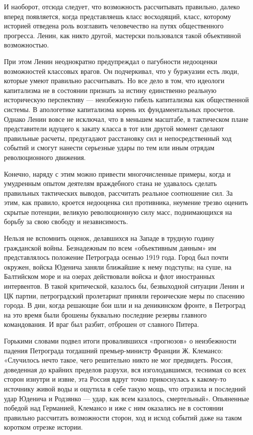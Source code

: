 \documentclass[12pt, a4paper, openany]{book}
\begin{document}
И наоборот, отсюда следует, что возможность рассчитывать правильно, далеко вперед появляется, когда представляешь класс восходящий, класс, которому историей отведена роль возглавить человечество на путях общественного прогресса. Ленин, как никто другой, мастерски пользовался такой объективной возможностью.

При этом Ленин неоднократно предупреждал о пагубности недооценки возможностей классовых врагов. Он подчеркивал, что у буржуазии есть люди, которые умеют правильно рассчитывать. Но все дело в том, что идеологи капитализма не в состоянии признать за истину единственно реальную историческую перспективу — неизбежную гибель капитализма как общественной системы. В апологетике капитализма корень их фундаментальных просчетов. Однако Ленин вовсе не исключал, что в меньшем масштабе, в тактическом плане представители идущего к закату класса в тот или другой момент сделают правильные расчеты, предугадают расстановку сил и непосредственный ход событий и смогут нанести серьезные удары по тем или иным отрядам революционного движения.

Конечно, наряду с этим можно привести многочисленные примеры, когда и умудренным опытом деятелям враждебного стана не удавалось сделать правильных тактических выводов, рассчитать реальное соотношение сил. За этим, как правило, кроется недооценка сил противника, неумение трезво оценить скрытые потенции, великую революционную силу масс, поднимающихся на борьбу за свою свободу и независимость.

Нельзя не вспомнить оценок, делавшихся на Западе в трудную годину гражданской войны. Безнадежным по всем «объективным данным» им представлялось положение Петрограда осенью 1919 года. Город был почти окружен, войска Юденича заняли ближайшие к нему подступы; на суше, на Балтийском море и на озерах действовали войска и флот иностранных интервентов. В такой критической, казалось бы, безвыходной ситуации Ленин и ЦК партии, петроградский пролетариат приняли героические меры по спасению города. В дни, когда решающие бои шли и на деникинском фронте, в Петроград на это время были брошены буквально последние резервы главного командования. И враг был разбит, отброшен от славного Питера.

Горькими словами подвел итоги провалившихся «прогнозов» о неизбежности падения Петрограда тогдашний премьер-министр Франции Ж. Клемансо: «Случилось нечто такое, чего решительно никто не мог предвидеть. Россия, доведенная до крайних пределов разрухи, вся изголодавшимся, теснимая со всех сторон изнутри и извне, эта Россия вдруг точно прикоснулась к какому-то источнику живой воды и ощутила в себе такую мощь, что отразила и последний удар Юденича и Родзянко — удар, как всем казалось, смертельный». Опьяненные победой над Германией, Клемансо и иже с ним оказались не в состоянии правильно рассчитать возможности сторон, ход и исход событий даже на таком коротком отрезке истории.
\end{document}

